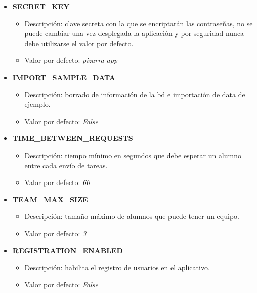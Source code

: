 \documentclass[11pt,spanish,listoffigures,listoftables]{tfgetsinf}
\begin{document}
\begin{itemize}
	\item \textbf{SECRET\_KEY}
	\begin{itemize}
		\item Descripción: clave secreta con la que se encriptarán las contraseñas, no se puede cambiar una vez desplegada la aplicación y por seguridad nunca debe utilizarse el valor por defecto.
		\item Valor por defecto: \textit{pizarra-app}
	\end{itemize}
\end{itemize}

\begin{itemize}
	\item \textbf{IMPORT\_SAMPLE\_DATA}
	\begin{itemize}
		\item Descripción: borrado de información de la \acrshort{bd} e importación de data de ejemplo.
		\item Valor por defecto: \textit{False}
	\end{itemize}
\end{itemize}

\begin{itemize}
	\item \textbf{TIME\_BETWEEN\_REQUESTS}
	\begin{itemize}
		\item Descripción: tiempo mínimo en segundos que debe esperar un \gls{alumno} entre cada envío de \Gls{tarea}s.
		\item Valor por defecto: \textit{60}
	\end{itemize}
\end{itemize}

\begin{itemize}
	\item \textbf{TEAM\_MAX\_SIZE}
	\begin{itemize}
		\item Descripción: tamaño máximo de \Gls{alumno}s que puede tener un \Gls{equipo}.
		\item Valor por defecto: \textit{3}
	\end{itemize}
\end{itemize}

\begin{itemize}
	\item \textbf{REGISTRATION\_ENABLED}
	\begin{itemize}
		\item Descripción: habilita el registro de usuarios en el aplicativo.
		\item Valor por defecto: \textit{False}
	\end{itemize}
\end{itemize}
\end{document}
